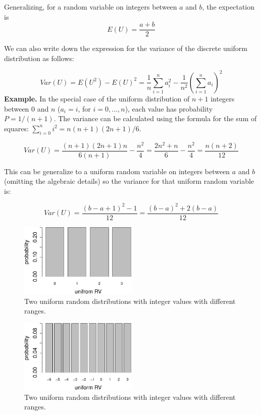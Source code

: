 \documentclass[
  letterpaper,
  DIV=11,
  numbers=noendperiod]{scrreprt}
\begin{document}
Generalizing, for a random variable on integers between \(a\) and \(b\),
the expectation is \[ E(U) = \frac{a+b}{2}\]

We can also write down the expression for the variance of the discrete
uniform distribution as follows:

\[ Var(U) = E(U^2) - E(U)^2 =  \frac{1}{n} \sum_{i=1}^n  a_i^2  -  \frac{1}{n^2} \left(\sum_{i=1}^n  a_i \right)^2\]
\textbf{Example.} In the special case of the uniform distribution of
\(n+1\) integers between 0 and \(n\) (\(a_i = i\), for \(i=0,..., n\)),
each value has probability \(P = 1/(n+1)\). The variance can be
calculated using the formula for the sum of squares:
\(\sum_{i=0}^n i^2 =n(n+1)(2n+1)/6\).

\[ Var(U) = \frac{(n+1)(2n+1)n}{6(n+1)} - \frac{n^2}{4} =   \frac{2n^2+n}{6} - \frac{n^2}{4} = \frac{n(n+2)}{12}
\]

This can be generalize to a uniform random variable on integers between
\(a\) and \(b\) (omitting the algebraic details) so the variance for
that uniform random variable is:

\[ Var(U) = \frac{(b-a+1)^2 - 1}{12} = \frac{(b-a)^2 + 2(b-a)}{12}
\]

\begin{figure}

{\centering \includegraphics[width=0.5\textwidth,height=\textheight]{./probdist_files/figure-pdf/unif-dist-1.pdf}

}

\caption{Two uniform random distributions with integer values with
different ranges.}

\end{figure}

\begin{figure}

{\centering \includegraphics[width=0.5\textwidth,height=\textheight]{./probdist_files/figure-pdf/unif-dist-2.pdf}

}

\caption{Two uniform random distributions with integer values with
different ranges.}

\end{figure}
\end{document}
